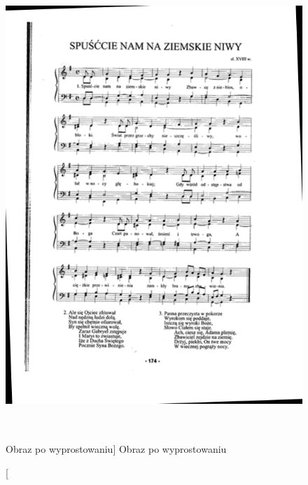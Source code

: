 \documentclass[a4paper,12pt]{article}
\begin{document}
                \begin{figure}[!ht]  
        		    \begin{center}
        			    \includegraphics[height=17cm, frame] {image//exampleImage//003_b.png} 
        		    \end{center}
        			\caption
            			[Obraz po wyprostowaniu]  
            			{Obraz po wyprostowaniu}  
        	    \end{figure} 
		
		        \newpage 
		 
\end{document}
